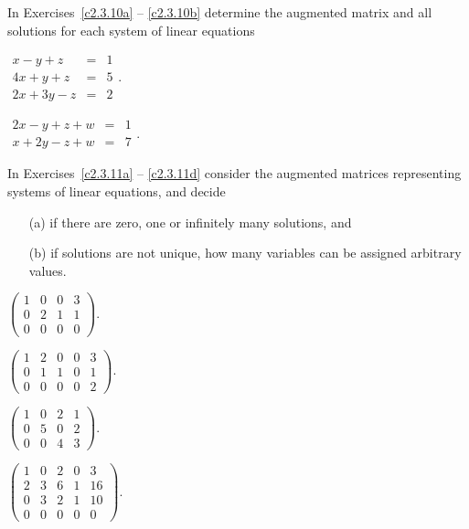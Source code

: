 \noindent In Exercises~\ref{c2.3.10a} -- \ref{c2.3.10b} determine the
augmented matrix and all solutions for each system of linear equations
\begin{exercise} \label{c2.3.10a}
$\begin{array}{rcl}
x-y+z & = & 1 \\
4x+y+z & = & 5 \\
2x+3y-z & = & 2 \end{array}$.
\end{exercise}
\begin{exercise} \label{c2.3.10b}
$\begin{array}{rcl}
2x-y+z+w & = & 1\\
x+2y-z+w & = & 7 \end{array}$.
\end{exercise}

\noindent In Exercises~\ref{c2.3.11a} -- \ref{c2.3.11d} consider the
augmented matrices representing systems of linear equations, and decide
\begin{itemize}
\item[(a)] if there are zero, one or infinitely many solutions, and
\item[(b)] if solutions are not unique, how many variables can be
assigned arbitrary values.
\end{itemize}
\begin{exercise} \label{c2.3.11a}
$\left(\begin{array}{ccc|c} 1 & 0 & 0 &3 \\0 & 2 & 1 & 1\\ 0 & 0 & 0 & 0
\end{array}\right)$.
\end{exercise}
\begin{exercise} \label{c2.3.11b}
$\left(\begin{array}{cccc|c} 1 & 2 & 0 & 0 & 3\\ 0 & 1 & 1 & 0 & 1\\
0 & 0 & 0 & 0 & 2 \end{array}\right)$.
\end{exercise}
\begin{exercise} \label{c2.3.11c}
$\left(\begin{array}{ccc|c}  1 & 0 & 2 & 1\\ 0 & 5 & 0 & 2 \\ 0 & 0 & 4 & 3
\end{array}\right)$.
\end{exercise}
\begin{exercise} \label{c2.3.11d}
$\left(\begin{array}{cccc|c} 1 & 0 & 2 & 0 & 3 \\ 2 & 3 & 6 & 1 & 16\\
0 & 3 & 2 & 1 & 10 \\ 0 & 0 & 0 & 0 & 0  \end{array}\right)$.
\end{exercise}

